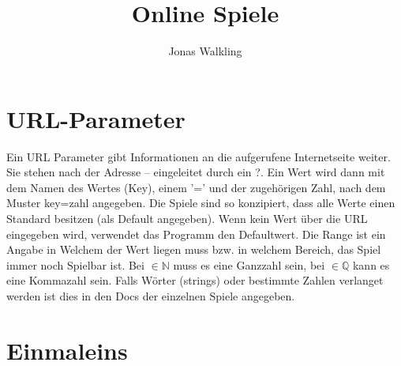 \documentclass[]{article}
\title{Online Spiele}
\author{Jonas Walkling}
\begin{document}
\maketitle
\tableofcontents

\section*{URL-Parameter}

\begin{multicols}{2}


Ein URL Parameter gibt Informationen an die aufgerufene Internetseite weiter. Sie stehen nach der Adresse -- eingeleitet durch ein ?.
Ein Wert wird dann mit dem Namen des Wertes (Key), einem '=' und der zugehörigen Zahl, nach dem Muster key=zahl angegeben. Die Spiele sind so konzipiert, dass alle Werte einen Standard besitzen (als Default angegeben). Wenn kein Wert über die URL eingegeben wird, verwendet das Programm den Defaultwert.
Die Range ist ein Angabe in Welchem der Wert liegen muss bzw. in welchem Bereich, das Spiel immer noch Spielbar ist. Bei $\in \mathbb{N}$ muss es eine Ganzzahl sein, bei $\in \mathbb{Q}$ kann es eine Kommazahl sein. Falls Wörter (strings) oder bestimmte Zahlen verlanget werden ist dies in den Docs der einzelnen Spiele angegeben.

\end{multicols}

\section{Einmaleins}
\end{document}
